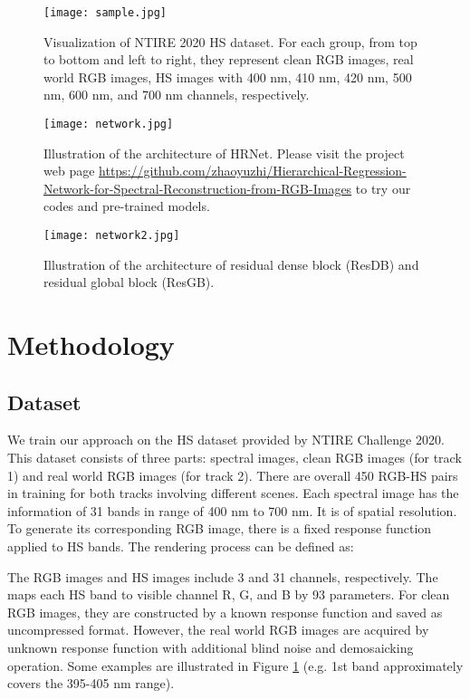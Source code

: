 \documentclass[10pt,twocolumn,letterpaper]{article}
\begin{document}
\begin{figure}[htbp]
\centering
\texttt{[image: sample.jpg]}
\caption{Visualization of NTIRE 2020 HS dataset. For each group, from top to bottom and left to right, they represent clean RGB images, real world RGB images, HS images with 400 nm, 410 nm, 420 nm, 500 nm, 600 nm, and 700 nm channels, respectively.}
\label{sample}
\end{figure}

\begin{figure*}[t]
\centering
\texttt{[image: network.jpg]}
\caption{Illustration of the architecture of HRNet. Please visit the project web page \url{https://github.com/zhaoyuzhi/Hierarchical-Regression-Network-for-Spectral-Reconstruction-from-RGB-Images} to try our codes and pre-trained models.}
\label{network}
\end{figure*}

\begin{figure}[htbp]
\centering
\texttt{[image: network2.jpg]}
\caption{Illustration of the architecture of residual dense block (ResDB) and residual global block (ResGB).}
\label{network2}
\end{figure}

\section{Methodology}

\subsection{Dataset}

We train our approach on the HS dataset provided by NTIRE Challenge 2020. This dataset consists of three parts: spectral images, clean RGB images (for track 1) and real world RGB images (for track 2). There are overall 450 RGB-HS pairs in training for both tracks involving different scenes. Each spectral image has the information of 31 bands in range of 400 nm to 700 nm. It is of  spatial resolution. To generate its corresponding RGB image, there is a fixed response function applied to HS bands. The rendering process can be defined as:



The RGB images and HS images include 3 and 31 channels, respectively. The  maps each HS band to visible channel R, G, and B by 93 parameters. For clean RGB images, they are constructed by a known response function and saved as uncompressed format. However, the real world RGB images are acquired by unknown response function with additional blind noise and demosaicking operation. Some examples are illustrated in Figure \ref{sample} (e.g. 1st band approximately covers the 395-405 nm range).
\end{document}
